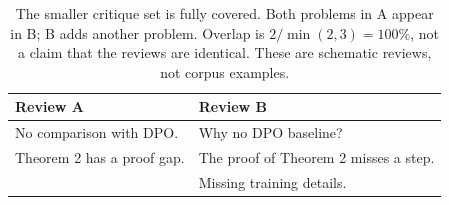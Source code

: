 \begin{table}[H]
\centering\footnotesize
\begin{tabular}{p{}p{}}
\toprule
Review A & Review B \\
\midrule
No comparison with DPO. & Why no DPO baseline? \\
Theorem 2 has a proof gap. & The proof of Theorem 2 misses a step. \\
& Missing training details. \\
\bottomrule
\end{tabular}
\caption{The smaller critique set is fully covered. Both problems in A appear in B; B adds another problem. Overlap is $2/\min(2,3)=100\%$, not a claim that the reviews are identical. These are schematic reviews, not corpus examples.}
\label{tab:match_example}
\end{table}
